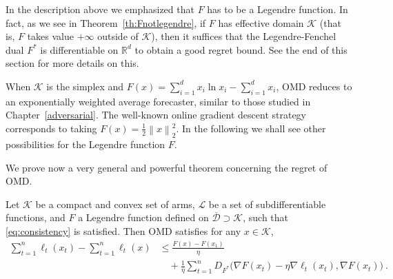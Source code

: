 \documentclass[11pt]{hackednow}
\newcommand{\R}{\mathbb{R}}
\newcommand{\cL}{\mathcal{L}}
\newcommand{\cK}{\mathcal{K}}
\newcommand{\oD}{\overline{\mathcal{D}}}
\newcommand{\norm}[1]{\left\|{#1}\right\|}
\begin{document}
In the description above we emphasized that $F$ has to be a Legendre function. In fact, as we see in Theorem~\ref{th:Fnotlegendre}, if $F$ has effective domain $\cK$ (that is, $F$ takes value $+\infty$ outside of $\cK$), then it suffices that the Legendre-Fenchel dual $F^*$ is differentiable on $\R^d$ to obtain a good regret bound. See the end of this section for more details on this.

When $\cK$ is the simplex and $F(x) = \sum_{i=1}^d x_i \ln x_i - \sum_{i=1}^d x_i$, OMD reduces to 
an exponentially weighted average forecaster, similar to those studied in Chapter~\ref{adversarial}. The well-known online gradient descent strategy corresponds to taking $F(x) = \frac12 \norm{x}^2_2$. In the following we shall see other possibilities for the Legendre function $F$.

We prove now a very general and powerful theorem concerning the regret of OMD.
\begin{theorem} \label{th:MGD}
Let $\cK$ be a compact and convex set of arms, $\cL$ be a set of subdifferentiable functions, and $F$ a Legendre function defined on $\oD \supset \cK$, such that \eqref{eq:consistency} is satisfied. Then OMD satisfies for any $x \in \cK$,
\begin{align*}
\sum_{t=1}^n \ell_t(x_t) - \sum_{t=1}^n \ell_t(x)
& \leq \frac{F(x) - F(x_1)}{\eta} \\
&  \quad + \frac{1}{\eta} \sum_{t=1}^n D_{F^*}\bigg(\nabla F(x_t) - \eta \nabla \ell_t(x_t), \nabla F(x_t)\bigg)~.
\end{align*}
\end{theorem}
\end{document}
